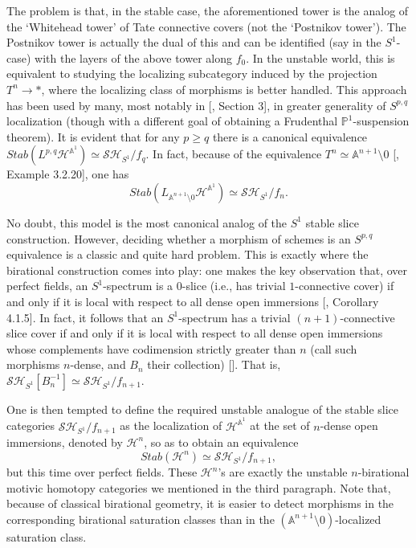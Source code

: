 The problem is that, in the stable case, the aforementioned tower is the analog of the `Whitehead tower' of Tate connective covers (not the `Postnikov tower'). The Postnikov tower is actually the dual of this and can be identified (say in the $S^1$-case) with the layers of the above tower along $f_0$. In the unstable world, this is equivalent to studying the localizing subcategory induced by the projection $T^n\to *$, where the localizing class of morphisms is better handled. This approach has been used by many, most notably in [\cite{asok2023p}, Section 3], in greater generality of $S^{p,q}$ localization (though with a different goal of obtaining a Frudenthal $\mathbb{P}^1$-suspension theorem). It is evident that for any $p\geq q$ there is a canonical equivalence $Stab(L^{p,q}\mathcal{H}^{\mathbb{A}^1})\simeq \mathcal{SH}_{S^1}/f_q$. In fact, because of the equivalence $T^n\simeq \mathbb{A}^{n+1}\setminus 0$ [\cite{morel19991}, Example 3.2.20], one has $$Stab(L_{\mathbb{A}^{n+1}\setminus 0}\mathcal{H}^{\mathbb{A}^1})\simeq \mathcal{SH}_{S^1}/f_n.$$

No doubt, this model is the most canonical analog of the $S^1$ stable slice construction. However, deciding whether a morphism of schemes is an $S^{p,q}$ equivalence is a classic and quite hard problem. This is exactly where the birational construction comes into play: one makes the key observation that, over perfect fields, an $S^1$-spectrum is a $0$-slice (i.e., has trivial $1$-connective cover) if and only if it is local with respect to all dense open immersions [\cite{levine2008homotopy}, Corollary 4.1.5]. In fact, it follows that an $S^1$-spectrum has a trivial $(n+1)$-connective slice cover if and only if it is local with respect to all dense open immersions whose complements have codimension strictly greater than $n$ (call such morphisms $n$-dense, and $B_n$ their collection) [\cite{pelaez2013birational}]. That is, $\mathcal{SH}_{S^1}[B_n^{-1}]\simeq \mathcal{SH}_{S^1}/f_{n+1}$. 

One is then tempted to define the required unstable analogue of the stable slice categories $\mathcal{SH}_{S^1}/f_{n+1}$ as the localization of $\mathcal{H}^{\mathbb{A}^1}$ at the set of $n$-dense open immersions, denoted by $\mathcal{H}^{n}$, so as to obtain an equivalence $$Stab(\mathcal{H}^{n})\simeq \mathcal{SH}_{S^1}/f_{n+1},$$ but this time over perfect fields. These $\mathcal{H}^{n}$'s are exactly the unstable $n$-birational motivic homotopy categories we mentioned in the third paragraph. Note that, because of classical birational geometry, it is easier to detect morphisms in the corresponding birational saturation classes than in the $(\mathbb{A}^{n+1}\setminus0)$-localized saturation class.

